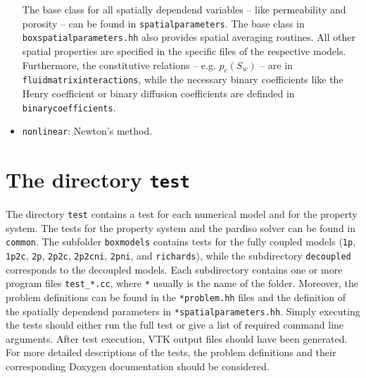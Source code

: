 \begin{itemize}
The base class for all spatially dependend variables -- like permeability and porosity  -- 
can be found in \texttt{spatialparameters}. The base class in \texttt{boxspatialparameters.hh} 
also provides spatial averaging routines. All other spatial properties are specified in the specific
 files of the respective models. Furthermore, the constitutive relations -- e.g. $p_c(S_w) $ -- are in \texttt{fluidmatrixinteractions}, 
while the necessary binary coefficients like the Henry coefficient or binary diffusion coefficients are definded in
 \texttt{binarycoefficients}.


\item \texttt{nonlinear}: Newton's method.


% 
% 
% 
% 
% 
% 
% 
% 


\end{itemize}



\section{The directory \texttt{test}}\label{sec:test}


The directory \texttt{test} contains a test for each numerical model and for 
the property system. The tests for the property system and the pardiso solver can be found in \texttt{common}. 
The subfolder \texttt{boxmodels} contains tests for the fully 
coupled models (\texttt{1p},  \texttt{1p2c},  \texttt{2p},  \texttt{2p2c},  
\texttt{2p2cni},  \texttt{2pni},  and \texttt{richards}), while the subdirectory \texttt{decoupled} corresponds to the decoupled models. 
Each subdirectory contains one or more program files \texttt{test\_*.cc}, where \texttt{*} usually is the 
name of the folder. Moreover, the problem definitions can be found 
in the \texttt{*problem.hh} files and the definition of the spatially dependend parameters in \texttt{*spatialparameters.hh}. Simply executing the tests should either run the 
full test or give a list of required command line arguments. After test execution, 
VTK output files should have been generated. 
For more detailed descriptions of the tests, the problem definitions and their corresponding 
Doxygen documentation should be considered. 

